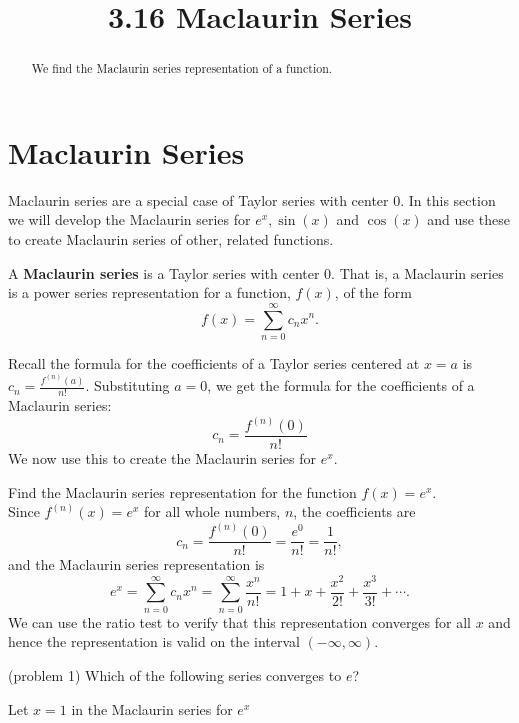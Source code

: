 \documentclass[handout]{ximera}
\title{3.16 Maclaurin Series}
\begin{document}
\begin{abstract}
We find the Maclaurin series representation of a function.
\end{abstract}

\maketitle

\section{Maclaurin Series}


Maclaurin series are a special case of Taylor series with center $0$. In this section we will develop the Maclaurin series for 
$e^x, \sin(x)$ and $\cos(x)$ and use these to create Maclaurin series of other, related functions.

\begin{definition} 
A \textbf{Maclaurin series} is a Taylor series with center 0. That is, a Maclaurin series is a power series representation 
for a function, $f(x)$, of the form
\[
f(x) = \sum_{n=0}^\infty c_n x^n.
\]
\end{definition}
 
Recall the formula for the coefficients of a Taylor series centered at $x = a$ is $\displaystyle c_n = \frac{f^{(n)}(a)}{n!}$.
Substituting $a = 0$, we get the formula for the coefficients of a Maclaurin series:
\[
c_n = \frac{f^{(n)}(0)}{n!}
\]
We now use this to create the Maclaurin series for $e^x$.
\begin{example} 
Find the Maclaurin series representation for the function $f(x) = e^x$.\\
Since $f^{(n)}(x) = e^x$ for all whole numbers, $n$, the coefficients are
\[
c_n = \frac{f^{(n)}(0)}{n!} = \frac{e^0}{n!} = \frac{1}{n!},
\]
and the Maclaurin series representation is 
\[
e^x = \sum_{n=0}^\infty c_n x^n = \sum_{n=0}^\infty \frac{x^n}{n!} = 1 + x + \frac{x^2}{2!} + \frac{x^3}{3!} + \cdots.
\]
We can use the ratio test to verify that this representation converges for all $x$ and 
hence the representation is valid on the interval $(-\infty, \infty)$.
\end{example}

\begin{problem}(problem 1)
Which of the following series converges to $e$?
\begin{hint}
Let $x = 1$ in the Maclaurin series for $e^x$
\end{hint}

\begin{multipleChoice}
\end{multipleChoice}
\end{problem}
\end{document}
